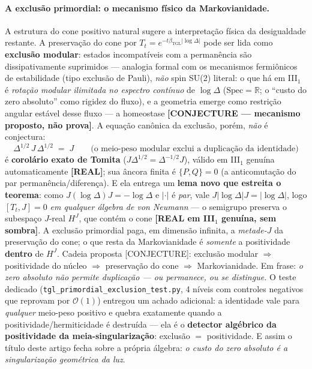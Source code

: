 \documentclass[12pt,a4paper]{article}
\newcommand{\betatgl}{\beta_{\text{TGL}}}
\begin{document}
\paragraph{A exclusão primordial: o mecanismo físico da Markovianidade.}  A estrutura do cone positivo natural sugere a interpretação física da desigualdade restante.  A preservação do cone por $T_t = e^{-t\betatgl|\log\Delta|}$ pode ser lida como \textbf{exclusão modular}: estados incompatíveis com a permanência são dissipativamente suprimidos --- analogia formal com os mecanismos fermiônicos de estabilidade (tipo exclusão de Pauli), \emph{não} spin SU(2) literal: o que há em III$_1$ é \emph{rotação modular ilimitada no espectro contínuo} de $\log\Delta$ ($\mathrm{Spec}=\mathbb R$; o ``custo do zero absoluto'' como rigidez do fluxo), e a geometria emerge como restrição angular estável desse fluxo --- a homeostase \textbf{[CONJECTURE --- mecanismo proposto, não prova]}.  A equação canônica da exclusão, porém, \emph{não} é conjectura:
\begin{equation}
\Delta^{1/2}\,J\,\Delta^{1/2} \;=\; J
\qquad\text{(o meio-peso modular exclui a duplicação da identidade)}
\end{equation}
é \textbf{corolário exato de Tomita} ($J\Delta^{1/2}=\Delta^{-1/2}J$), válido em III$_1$ genuína automaticamente \textbf{[REAL]}; sua âncora finita é $\{P,Q\}=0$ (a anticomutação do par permanência/diferença).  E ela entrega um \textbf{lema novo que estreita o teorema}: como $J(\log\Delta)J = -\log\Delta$ e $|\cdot|$ é \emph{par}, vale $J|\log\Delta|J = |\log\Delta|$, logo $[T_t, J] = 0$ \emph{em qualquer álgebra de von Neumann} --- o semigrupo preserva o subespaço $J$-real $H^J$, que contém o cone \textbf{[REAL em III$_1$ genuína, sem sombra]}.  A exclusão primordial paga, em dimensão infinita, a \emph{metade-$J$} da preservação do cone; o que resta da Markovianidade é \emph{somente} a positividade \textbf{dentro} de $H^J$.  Cadeia proposta [CONJECTURE]: exclusão modular $\Rightarrow$ positividade do núcleo $\Rightarrow$ preservação do cone $\Rightarrow$ Markovianidade.  Em frase: \emph{o zero absoluto não permite duplicação --- ou permanece, ou se distingue.}  O teste dedicado (\texttt{tgl\_primordial\_exclusion\_test.py}, 4 níveis com controles negativos que reprovam por $\mathcal O(1)$) entregou um achado adicional: a identidade vale para \emph{qualquer} meio-peso positivo e quebra exatamente quando a positividade/hermiticidade é destruída --- ela é o \textbf{detector algébrico da positividade da meia-singularização}: exclusão $=$ positividade.  E assim o título deste artigo fecha sobre a própria álgebra: \emph{o custo do zero absoluto é a singularização geométrica da luz}.
\end{document}

